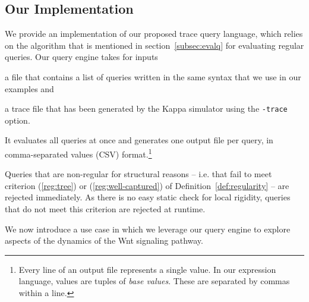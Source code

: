 \documentclass[runningheads]{llncs}
\begin{document}
\subsection{Our Implementation}

We provide an implementation of our proposed trace query language,
which relies on the algorithm that is mentioned in
section~\ref{subsec:evalq} for evaluating regular queries. Our query
engine takes for inputs
\begin{inparaenum}[(i)]
\item a file that contains a list of queries written in the same
  syntax that we use in our examples and
\item a trace file that has been generated by the Kappa simulator
  using the \texttt{-trace} option.
\end{inparaenum}
It evaluates all queries at once and generates one output file per
query, in comma-separated values (CSV) format.\footnote{Every line of
  an output file represents a single value. In our expression
  language, values are tuples of \emph{base values}. These are
  separated by commas within a line.}

Queries that are non-regular for structural reasons -- i.e. that fail
to meet criterion (\ref{reg:tree}) or (\ref{reg:well-captured}) of
Definition~\ref{def:regularity} -- are rejected immediately.  As there
is no easy static check for local rigidity,
queries that do not meet this criterion are rejected at runtime.

\medskip

We now introduce a use case in which we leverage our query engine to
explore aspects of the dynamics of the Wnt signaling pathway.


\iffalse
However, the first users of our query engine never expressed any
frustration with it, as they naturally came up with regular queries
only.\footnote{Furthermore, they would also write the clauses of their
  patterns in an order that reflects their dependency trees.}  In our
opinion, this is due to the difficulty of interpreting non-regular
queries operationally.
\fi










% 



\nocite{*}  

\newpage

\appendix


\end{document}
